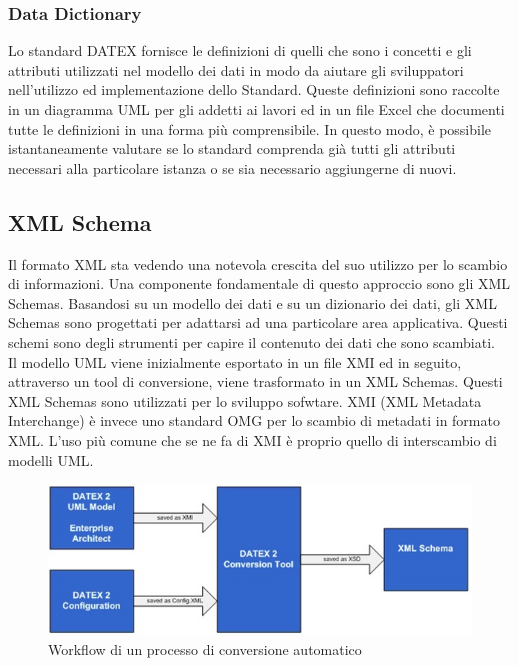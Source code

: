 \subsubsection{Data Dictionary}
Lo standard DATEX fornisce le definizioni di quelli che sono i concetti e gli attributi utilizzati nel modello dei dati in modo da aiutare gli sviluppatori nell'utilizzo ed implementazione dello Standard. Queste definizioni sono raccolte in un diagramma UML per gli addetti ai lavori ed in un file Excel che documenti tutte le definizioni in una forma più comprensibile. In questo modo, è possibile istantaneamente valutare se lo standard comprenda già tutti gli attributi necessari alla particolare istanza o se sia necessario aggiungerne di nuovi.

\subsection{XML Schema}
Il formato XML sta vedendo una notevola crescita del suo utilizzo per lo scambio di informazioni. Una componente fondamentale di questo approccio sono gli XML Schemas. Basandosi su un modello dei dati e su un dizionario dei dati, gli XML Schemas sono progettati per adattarsi ad una particolare area applicativa. Questi schemi sono degli strumenti per capire il contenuto dei dati che sono scambiati.\\
Il modello UML viene inizialmente esportato in un file XMI ed in seguito, attraverso un tool di conversione, viene trasformato in un XML Schemas.
Questi XML Schemas sono utilizzati per lo sviluppo sofwtare. XMI (XML Metadata Interchange) è invece uno standard OMG per lo scambio di metadati in formato XML. L'uso più comune che se ne fa di XMI è proprio quello di interscambio di modelli UML.
\begin{figure}
	\begin{center}
		\includegraphics[width=0.8\columnwidth]{images/datexii_xml}
	\end{center}
	\caption{Workflow di un processo di conversione automatico}
	\label{fig:datexii_xml}
\end{figure}


